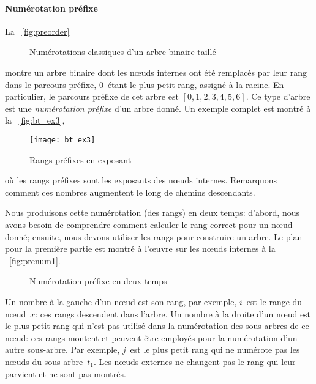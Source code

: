\paragraph{Numérotation préfixe}

La \fig~\vref{fig:preorder}
\begin{figure}
\centering
{}
\;
\;
\;
\caption{Numérotations classiques d'un arbre binaire taillé
\label{fig:orders}}
\end{figure}
montre un arbre binaire dont les n{\oe}uds internes ont été remplacés
par leur rang dans le parcours préfixe, \(0\)~étant le plus petit
rang, assigné à la racine. En particulier, le parcours préfixe de cet
arbre est \([0,1,2,3,4,5,6]\). Ce type d'arbre est une
\emph{numérotation préfixe}
d'un arbre donné. Un exemple complet est montré à la
\fig~\vref{fig:bt_ex3},
\begin{figure}[b]
\centering
\texttt{[image: bt\_ex3]}
\caption{Rangs préfixes en exposant\label{fig:bt_ex3}}
\end{figure}
où les rangs préfixes sont les exposants des n{\oe}uds
internes. Remarquons comment ces nombres augmentent le long de chemins
descendants.

Nous produisons cette numérotation (des rangs) en deux temps: d'abord,
nous avons besoin de comprendre comment calculer le rang correct pour
un n{\oe}ud donné; ensuite, nous devons utiliser les rangs pour
construire un arbre. Le plan pour la première partie est montré à
l'{\oe}uvre sur les n{\oe}uds internes à la \fig~\vref{fig:prenum1}.
\begin{figure}[t]
\centering
{}
\qquad
{}
\caption{Numérotation préfixe en deux temps\label{fig:prenum}}
\end{figure}
Un nombre à la gauche d'un n{\oe}ud est son rang, par exemple,
\(i\)~est le range du n{\oe}ud~\(x\): ces rangs descendent dans
l'arbre. Un nombre à la droite d'un n{\oe}ud est le plus petit rang
qui n'est pas utilisé dans la numérotation des sous-arbres de ce
n{\oe}ud: ces rangs montent et peuvent être employés pour la
numérotation d'un autre sous-arbre. Par exemple, \(j\)~est le plus
petit rang qui ne numérote pas les n{\oe}uds du
sous-arbre~\(t_1\). Les n{\oe}uds externes ne changent pas le rang qui
leur parvient et ne sont pas montrés.

